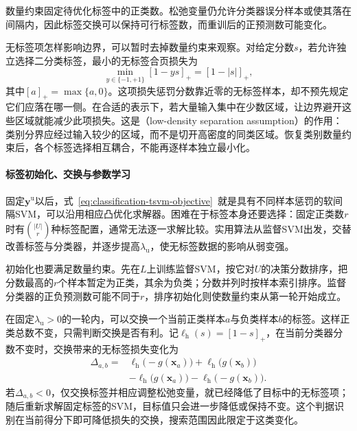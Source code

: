 数量约束固定待优化标签中的正类数。松弛变量仍允许分类器误分样本或使其落在间隔内，因此标签交换可以保持可行标签数，而重训后的正预测数可能变化。

无标签项怎样影响边界，可以暂时去掉数量约束来观察。对给定分数$s$，若允许独立选择二分类标签，最小的无标签合页损失为
\begin{equation}
  \label{eq:classification-tsvm-unlabeled-hinge}
  \min_{y\in\{-1,+1\}}[1-ys]_+=[1-|s|]_+,
\end{equation}
其中$[a]_+=\max\{a,0\}$。这项损失惩罚分数靠近零的无标签样本，却不预先规定它们应落在哪一侧。在合适的表示下，若大量输入集中在少数区域，让边界避开这些区域就能减少此项损失。这是（low-density separation assumption）的作用：类别分界应经过输入较少的区域，而不是切开高密度的同类区域。恢复类别数量约束后，各个标签选择相互耦合，不能再逐样本独立最小化。

\paragraph{标签初始化、交换与参数学习}
\label{sec:classification-tsvm-learning}
固定$\bm{y}^{\mathrm{u}}$以后，式~\eqref{eq:classification-tsvm-objective}~就是具有不同样本惩罚的软间隔SVM，可以沿用相应凸优化求解器。困难在于标签本身还要选择：固定正类数$r$时有$\binom{|U|}{r}$种标签配置，通常无法逐一求解比较。实用算法从监督SVM出发，交替改善标签与分类器，并逐步提高$\lambda_{\mathrm{u}}$，使无标签数据的影响从弱变强。

初始化也要满足数量约束。先在$L$上训练监督SVM，按它对$U$的决策分数排序，把分数最高的$r$个样本暂定为正类，其余为负类；分数并列时按样本索引排序。监督分类器的正负预测数可能不同于$r$，排序初始化则使数量约束从第一轮开始成立。

在固定$\lambda_{\mathrm{u}}>0$的一轮内，可以交换一个当前正类样本$a$与负类样本$b$的标签。这样正类总数不变，只需判断交换是否有利。记$\ell_{\mathrm{h}}(s)=[1-s]_+$，在当前分类器分数不变时，交换带来的无标签损失变化为
\begin{equation}
  \label{eq:classification-tsvm-swap}
  \begin{aligned}
    \Delta_{a,b}
      ={}&\ell_{\mathrm{h}}\bigl(-g(\bm{x}_a)\bigr)
          +\ell_{\mathrm{h}}\bigl(g(\bm{x}_b)\bigr)\\
       &-\ell_{\mathrm{h}}\bigl(g(\bm{x}_a)\bigr)
          -\ell_{\mathrm{h}}\bigl(-g(\bm{x}_b)\bigr).
  \end{aligned}
\end{equation}
若$\Delta_{a,b}<0$，仅交换标签并相应调整松弛变量，就已经降低了目标中的无标签项；随后重新求解固定标签的SVM，目标值只会进一步降低或保持不变。这个判据识别在当前得分下即可降低损失的交换，搜索范围因此限定于这类变化。

